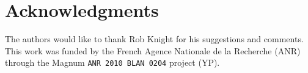 \section{Acknowledgments}
\label{sec:acknowledgments}
The authors would like to thank Rob Knight for his suggestions and comments.
This work was funded by the French Agence Nationale de la Recherche (ANR) through the {\sc Magnum} {\tt ANR 2010 BLAN 0204} 
project (YP).